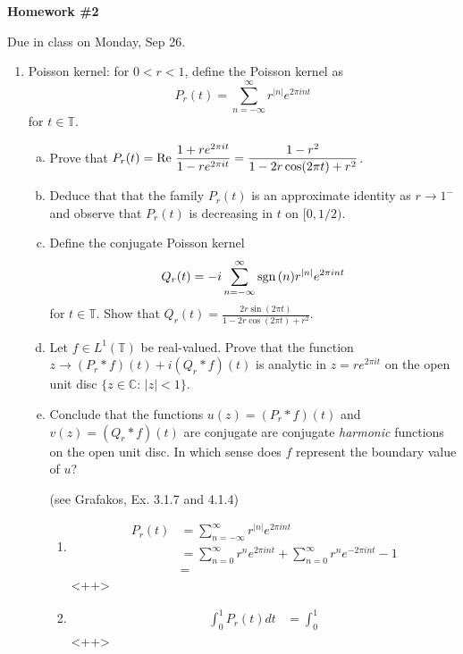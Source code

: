 \documentclass[12pt]{article}
\begin{document}
{\bf{Homework \#2}}


Due in class on Monday, Sep 26.


\begin{enumerate}

\item Poisson kernel: for $0<r<1$, define the Poisson kernel  as $$P_r (t) = \sum_{n=-\infty}^\infty r^{|n|} e^{2\pi i nt}$$ for $t\in \mathbb T$.

\begin{enumerate}[(a)]
\item Prove that $\displaystyle{P_r (t) = \textup{Re } \frac{1+ r e^{2\pi i t}}{1- r e^{2\pi i t}} = \frac{1-r^2}{1-2r \cos (2\pi t) + r^2}}$.
\item Deduce that that the family $P_r(t)$ is an approximate identity as $r \rightarrow 1^-$ and observe that $P_r (t)$ is decreasing in $t$ on $[0,1/2)$.
\item Define the conjugate Poisson kernel $$Q_r (t) = -i \sum_{n=-\infty}^\infty \textup{sgn}\, (n) r^{|n|} e^{2\pi i nt}$$ for $t\in \mathbb T$. Show that $\displaystyle{Q_r (t) =  \frac{2r \sin (2\pi t)}{1-2r \cos (2\pi t) + r^2}}$.
\item Let $f\in L^1 (\mathbb T)$ be real-valued. Prove that the function $ z  \rightarrow (P_r \ast f ) (t) + i (Q_r \ast f) (t)$ is analytic in $z = r e^{2\pi i t}$ on the open unit disc $\{ z \in \mathbb C: \, |z|< 1\}$.
\item Conclude that the functions $u (z) = (P_r \ast f ) (t)$ and $v (z) = (Q_r \ast f ) (t)$ are conjugate are conjugate {\it{harmonic}} functions on the open unit disc. In which sense does $f$ represent the boundary value of $u$?

(see Grafakos,  Ex. 3.1.7 and 4.1.4)

\begin{solution}

  \begin{enumerate}
    \item
      \begin{align*}
        P_r(t) &= \sum_{n=-\infty}^\infty r^{|n|} e^{2\pi i n t} \\
        &= \sum_{n=0}^{\infty} r^{n} e^{2 \pi i n t} + \sum_{n=0}^\infty r^n e^{- 2 \pi i n t} - 1 \\
        &=
      \end{align*}<++>

    \item
      \begin{align*}
        \int_{0}^{1} P_r(t) dt &= \int_{0}^{1}
      \end{align*}<++>


\end{enumerate}
\end{solution}
\end{enumerate}
\end{enumerate}
\end{document}
